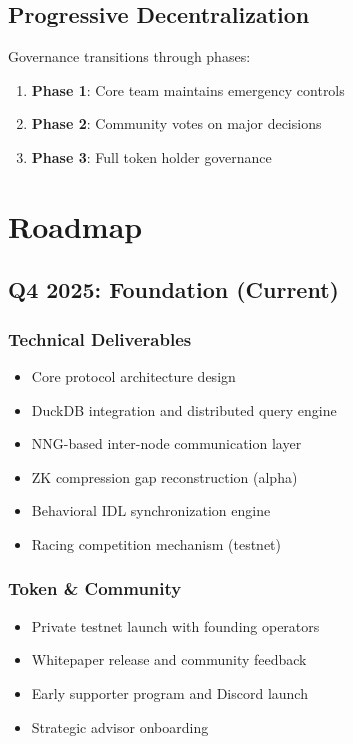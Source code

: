 \documentclass[12pt,a4paper]{article}
\begin{document}
\subsection{Progressive Decentralization}

Governance transitions through phases:

\begin{enumerate}
    \item \textbf{Phase 1}: Core team maintains emergency controls
    \item \textbf{Phase 2}: Community votes on major decisions
    \item \textbf{Phase 3}: Full token holder governance
\end{enumerate}

\section{Roadmap}

\subsection{Q4 2025: Foundation (Current)}

\subsubsection{Technical Deliverables}
\begin{itemize}
    \item[$\checkmark$] Core protocol architecture design
    \item[$\checkmark$] DuckDB integration and distributed query engine
    \item[$\checkmark$] NNG-based inter-node communication layer
    \item[$\square$] ZK compression gap reconstruction (alpha)
    \item[$\square$] Behavioral IDL synchronization engine
    \item[$\square$] Racing competition mechanism (testnet)
\end{itemize}

\subsubsection{Token \& Community}
\begin{itemize}
    \item Private testnet launch with founding operators
    \item Whitepaper release and community feedback
    \item Early supporter program and Discord launch
    \item Strategic advisor onboarding
\end{itemize}
\end{document}

